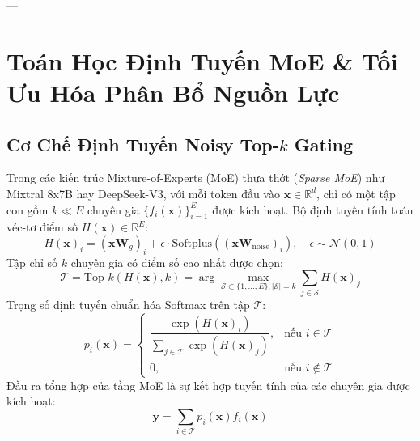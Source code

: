 ---

\section{Toán Học Định Tuyến MoE \& Tối Ưu Hóa Phân Bổ Nguồn Lực}
\label{sec:app-math-moe-routing}

\subsection{Cơ Chế Định Tuyến Noisy Top-$k$ Gating}
Trong các kiến trúc Mixture-of-Experts (MoE) thưa thớt (\textit{Sparse MoE}) như Mixtral 8x7B hay DeepSeek-V3, với mỗi token đầu vào $\mathbf{x} \in \mathbb{R}^d$, chỉ có một tập con gồm $k \ll E$ chuyên gia $\{f_i(\mathbf{x})\}_{i=1}^E$ được kích hoạt.
Bộ định tuyến tính toán véc-tơ điểm số $H(\mathbf{x}) \in \mathbb{R}^E$:
\begin{equation}
H(\mathbf{x})_i = (\mathbf{x} \mathbf{W}_g)_i + \epsilon \cdot \text{Softplus}((\mathbf{x} \mathbf{W}_{\text{noise}})_i), \quad \epsilon \sim \mathcal{N}(0, 1)
\end{equation}
Tập chỉ số $k$ chuyên gia có điểm số cao nhất được chọn:
\begin{equation}
\mathcal{T} = \text{Top-}k(H(\mathbf{x}), k) = \arg\max_{\mathcal{S} \subset \{1, \dots, E\}, |\mathcal{S}| = k} \sum_{j \in \mathcal{S}} H(\mathbf{x})_j
\end{equation}
Trọng số định tuyến chuẩn hóa Softmax trên tập $\mathcal{T}$:
\begin{equation}
p_i(\mathbf{x}) = \begin{cases}
\dfrac{\exp(H(\mathbf{x})_i)}{\sum_{j \in \mathcal{T}} \exp(H(\mathbf{x})_j)}, & \text{nếu } i \in \mathcal{T} \\
0, & \text{nếu } i \notin \mathcal{T}
\end{cases}
\end{equation}
Đầu ra tổng hợp của tầng MoE là sự kết hợp tuyến tính của các chuyên gia được kích hoạt:
\begin{equation}
\mathbf{y} = \sum_{i \in \mathcal{T}} p_i(\mathbf{x}) f_i(\mathbf{x})
\end{equation}


